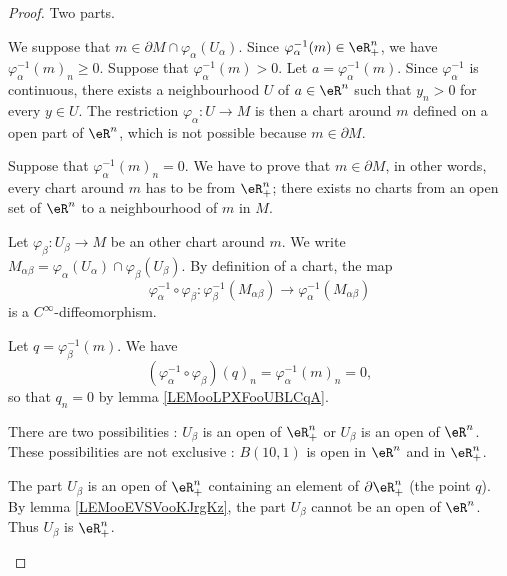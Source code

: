 \begin{proof}
	Two parts.
	\begin{subproof}
		\spitem[\( \Rightarrow\)]
		We suppose that \( m\in \partial M\cap \varphi_{\alpha}(U_{\alpha})\). Since \( \varphi_{\alpha}^{-1}(m)\in \eR^n_+\), we have \( \varphi_{\alpha}^{-1}(m)_n\geq 0\). Suppose that \( \varphi_{\alpha}^{-1}(m)>0\). Let \( a=\varphi_{\alpha}^{-1}(m)\). Since \( \varphi_{\alpha}^{-1}\) is continuous, there exists a neighbourhood \( U\) of \(a\in \eR^n \) such that \( y_n>0\) for every \( y\in U\). The restriction \(\varphi_{\alpha} \colon U\to M  \) is then a chart around \( m\) defined on a open part of \( \eR^n\), which is not possible because \( m\in\partial M\).

		\spitem[\( \Leftarrow\)]
		Suppose that \( \varphi_{\alpha}^{-1}(m)_n=0\). We have to prove that \( m\in\partial M\), in other words, every chart around \( m\) has to be from \( \eR^n_+\); there exists no charts from an open set of \( \eR^n\) to a neighbourhood of \( m\) in \( M\).

		Let \(\varphi_{\beta} \colon U_{\beta}\to M  \) be an other chart around \( m\). We write \( M_{\alpha\beta}=\varphi_{\alpha}(U_{\alpha})\cap \varphi_{\beta}(U_{\beta})\). By definition of a chart, the map
		\begin{equation}
			\varphi_{\alpha}^{-1}\circ \varphi_{\beta} \colon \varphi_{\beta}^{-1}(M_{\alpha\beta})\to \varphi_{\alpha}^{-1}(M_{\alpha\beta})
		\end{equation}
		is a \( C^{\infty}\)-diffeomorphism.

		Let \( q=\varphi_{\beta}^{-1}(m)\). We have
		\begin{equation}
			(\varphi_{\alpha}^{-1}\circ\varphi_{\beta})(q)_n=\varphi_{\alpha}^{-1}(m)_n=0,
		\end{equation}
		so that \( q_n=0\) by lemma \ref{LEMooLPXFooUBLCqA}.

		There are two possibilities : \( U_{\beta}\) is an open of \( \eR^n_+\) or \( U_{\beta}\) is an open of \( \eR^n\). These possibilities are not exclusive : \( B(10,1)\) is open in \( \eR^n\) and in \( \eR^n_+\).

		\begin{subproof}
			The part \( U_{\beta}\) is an open of \( \eR^n_+\) containing an element of \( \partial \eR^n_+\) (the point \( q\)). By lemma \ref{LEMooEVSVooKJrgKz}, the part \( U_{\beta}\) cannot be an open of \( \eR^n\). Thus \( U_{\beta}\) is \( \eR^n_+\).


\end{subproof}
\end{subproof}
\end{proof}
